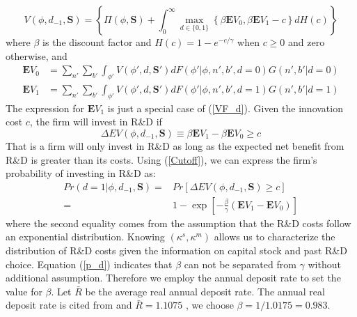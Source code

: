 \documentclass[English]{article}
\begin{document}
\begin{equation}\label{VF}
V(\phi, d_{-1},\mathbf{S})=\left\{ \Pi(\phi,\mathbf{S})+ \int_{0}^{\infty}\max_{d\in\{0,1\}}\left\{\beta\mathbf{E}V_{0},  \beta \mathbf{E}V_{1}-c\right\}dH(c) \right\} 
\end{equation}
where $\beta$ is the discount factor and $H(c)=1-e^{-c/\gamma}$ when $c\geq0$ and zero otherwise, and 
\begin{align}
  \mathbf{E}V_{0} &= \sum_{n'}\sum_{b'}\int_{\phi'}V(\phi',d,\mathbf{S}')dF(\phi'|\phi,n',b',d=0)G(n',b'|d=0) \label{EV0} \\
  \mathbf{E}V_{1} &=\sum_{n'}\sum_{b'}\int_{\phi'}V(\phi',d,\mathbf{S}')dF(\phi'|\phi,n',b',d=1)G(n',b'|d=1) \label{EV1}
\end{align}
The expression for $\mathbf{E}V_{1}$ is just a special case of (\ref{VF_d}). Given the innovation cost $c$, the firm will invest in R\&D if
\begin{equation}\label{Cutoff}
\Delta EV(\phi, d_{-1},\mathbf{S})\equiv \beta \mathbf{E}V_{1}-\beta \mathbf{E}V_{0}\geq c
\end{equation}
That is a firm will only invest in R\&D as long as the expected net benefit from R\&D is greater than its costs. Using (\ref{Cutoff}), we can express the firm's probability of investing in R\&D as:
\begin{align}\label{p_d}
Pr(d=1|\phi, d_{-1},\mathbf{S})=&Pr\left[\Delta EV(\phi, d_{-1},\mathbf{S})\geq c  \right] \\
                    =&1-\exp\left[-  \frac{\beta}{\gamma} ( \mathbf{E}V_{1}- \mathbf{E}V_{0}) \right] \nonumber
\end{align}
where the second equality comes from the assumption that the R\&D costs follow an exponential distribution. Knowing $(\kappa ^s, \kappa ^m)$ allows us to characterize the distribution of R\&D costs given the information on capital stock and past R\&D choice. Equation (\ref{p_d}) indicates that $\beta$ can not be separated from $\gamma$ without additional assumption. Therefore we employ the annual deposit rate to set the value for $\beta$. Let $\bar R$ be the average real annual deposit rate. The annual real deposit rate is cited from \citet{song2011} and $\bar R=1.1075$ , we choose $\beta =1/1.0175=0.983$. 
\end{document}
